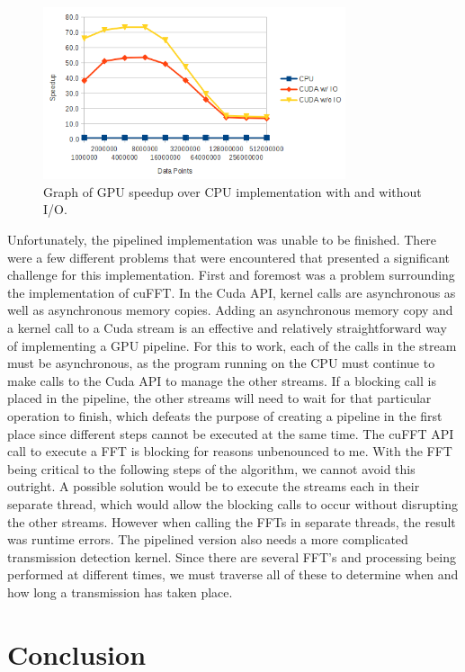 \documentclass[conference]{IEEEtran}
\begin{document}
\begin{figure}[ht!]
\centering
\includegraphics[width=3.5in]{speedupgraph.png}
\caption{Graph of GPU speedup over CPU implementation with and without I/O.}
\label{fig:speedupgraph}
\end{figure}

Unfortunately, the pipelined implementation was unable to be finished. There 
were a few different problems that were encountered that presented a significant
challenge for this implementation. First and foremost was a problem surrounding
the implementation of cuFFT. In the Cuda API, kernel calls are asynchronous
as well as asynchronous memory copies. Adding an asynchronous memory copy 
and a kernel call to a Cuda stream is an effective and relatively straightforward
way of implementing a GPU pipeline. For this to work, each of the calls in the
stream must be asynchronous, as the program running on the CPU must continue
to make calls to the Cuda API to manage the other streams. If a blocking call
is placed in the pipeline, the other streams will need to wait for that
particular operation to finish, which defeats the purpose of creating a 
pipeline in the first place since different steps cannot be executed at the 
same time. The cuFFT API call to execute a FFT is blocking for reasons
unbenounced to me. With the FFT being critical to the following steps
of the algorithm, we cannot avoid this outright. A possible solution would be to
execute the streams each in their separate thread, which would allow the
blocking calls to occur without disrupting the other streams. However when
calling the FFTs in separate threads, the result was runtime errors. The 
pipelined version also needs a more complicated transmission detection kernel.
Since there are several FFT's and processing being performed at different
times, we must traverse all of these to determine when and how long a
transmission has taken place.

\section{Conclusion}
\end{document}
